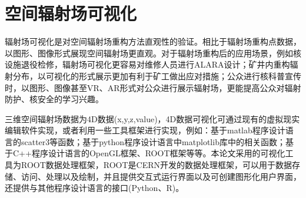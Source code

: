 \section{空间辐射场可视化}
辐射场可视化是对空间辐射场重构方法直观性的验证。相比于辐射场重构点数据，以图形、图像形式展现空间辐射场更直观。对于辐射场重构后的应用场景，例如核设施退役检修，辐射场可视化更容易对维修人员进行ALARA设计；矿井内重构辐射分布，以可视化的形式展示更加有利于矿工做出应对措施；公众进行核科普宣传时，以图形、图像甚至VR、AR形式对公众进行展示辐射场，更能提高公众对辐射防护、核安全的学习兴趣。

三维空间辐射场数据为4D数据(x,y,z,value)，4D数据可视化可通过现有的虚拟现实编辑软件实现\textsuperscript{\cite{张永领2020反应堆退役三维辐射场实时计算及可视化}}，或者利用一些工具框架进行实现，例如：基于matlab程序设计语言的scatter3等函数；基于python程序设计语言中matplotlib库中的相关函数；基于C++程序设计语言的OpenGL框架、ROOT框架等等。本论文采用的可视化工具为ROOT数据处理框架，ROOT是CERN开发的数据处理框架，可以用于数据存储、访问、处理以及绘制，并且提供交互式运行界面以及可创建图形化用户界面，还提供与其他程序设计语言的接口(Python、R)。